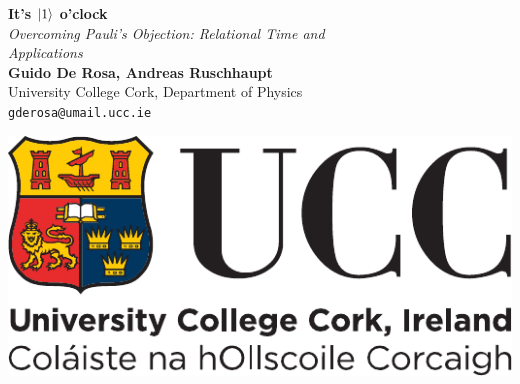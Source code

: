 \documentclass[a0,portrait]{a0poster}
\begin{document}
\large


\begin{minipage}[c]{0.70\linewidth}
\VeryHuge \color{NavyBlue} \textbf{It's $\ket{1}$ o'clock} \color{Black}\\ %
\Huge\textit{Overcoming Pauli's Objection: Relational Time and \\Applications}\\[2cm] %
\huge \textbf{Guido De Rosa, Andreas Ruschhaupt}\\[0.5cm] %
\huge University College Cork, Department of Physics\\[0.4cm] %
\large%
\texttt{gderosa@umail.ucc.ie}
\end{minipage}%
%
\begin{minipage}[t]{0.30\linewidth}
\includegraphics[width=19cm]{ucc_logo.pdf}\\  %
\end{minipage}

\vspace{0.4cm} %

\end{document}
